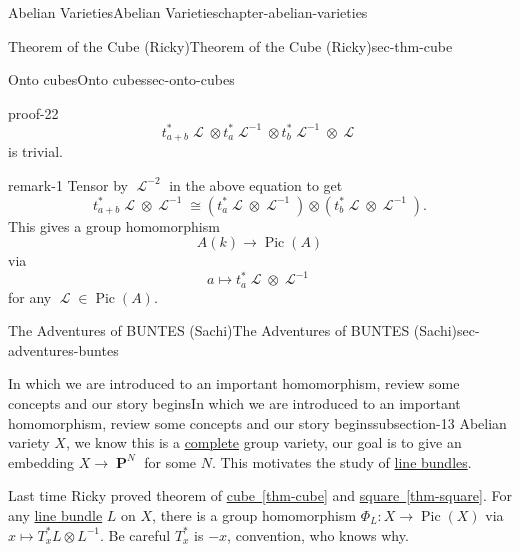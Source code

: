 \documentclass[oneside,10pt,]{book}
\numberwithin{equation}{section}
\newcommand{\sheaf}[1]{\operatorname{\mathcal{#1}}}
\DeclareMathOperator{\Pic}{Pic}
\DeclareMathOperator{\PP}{\mathbf{P}}
\begin{document}
\begin{chapterptx}{Abelian Varieties}{}{Abelian Varieties}{}{}{chapter-abelian-varieties}
\begin{sectionptx}{Theorem of the Cube (Ricky)}{}{Theorem of the Cube (Ricky)}{}{}{sec-thm-cube}
\begin{subsectionptx}{Onto cubes}{}{Onto cubes}{}{}{sec-onto-cubes}
\begin{proofptx}{}{proof-22}
\begin{equation*}
t_{a+b}^*\sheaf L \otimes t_{a}^*\sheaf L ^{-1}\otimes t_b^* \sheaf L ^{-1} \otimes \sheaf L
\end{equation*}
is trivial.%
\end{proofptx}
\begin{remark}{}{remark-1}%
\hypertarget{p-132}{}%
Tensor by \(\sheaf L^{-2}\) in the above equation to get%
\begin{equation*}
t_{a+b}^*\sheaf L \otimes\sheaf L^{-1} \cong ( t_{a}^*\sheaf L \otimes \sheaf L^{-1}) \otimes(t_b^* \sheaf L\otimes \sheaf L^{-1})\text{.}
\end{equation*}
This gives a group homomorphism%
\begin{equation*}
A(k) \to \Pic(A)
\end{equation*}
via%
\begin{equation*}
a\mapsto t_a^*\sheaf L \otimes \sheaf L^{-1}
\end{equation*}
for any \(\sheaf L \in \Pic(A)\).%
\end{remark}
\end{subsectionptx}
\end{sectionptx}
%
%
\typeout{************************************************}
\typeout{************************************************}
%
\begin{sectionptx}{The Adventures of BUNTES (Sachi)}{}{The Adventures of BUNTES (Sachi)}{}{}{sec-adventures-buntes}
%
%
\typeout{************************************************}
\typeout{************************************************}
%
\begin{subsectionptx}{In which we are introduced to an important homomorphism, review some concepts and our story begins}{}{In which we are introduced to an important homomorphism, review some concepts and our story begins}{}{}{subsection-13}
\hypertarget{p-133}{}%
Abelian variety  \(X\), we know this is a \hyperref[def-abelian-complete-var]{complete} group variety, our goal is to give an embedding \(X\to \PP^N\) for some \(N\). This motivates the study of \hyperref[def-line-bundle]{line bundles}.%
\par
\hypertarget{p-134}{}%
Last time Ricky proved theorem of \hyperref[thm-cube]{cube~\ref{thm-cube}} and \hyperref[thm-square]{square~\ref{thm-square}}. For any \hyperref[def-line-bundle]{line bundle}  \(L\) on \(X\), there is a group homomorphism \(\Phi_L\colon X \to \Pic(X)\) via \(x\mapsto T_x^* L\otimes L^{-1}\). Be careful \(T_x^*\) is \(-x\), convention, who knows why.%

\end{subsectionptx}
\end{sectionptx}
\end{chapterptx}
\end{document}
